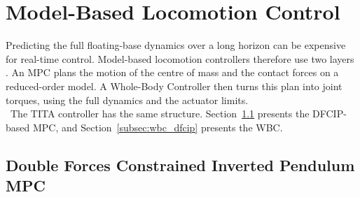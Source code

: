 \section{Model-Based Locomotion Control}
\label{sec:model_based_control}

Predicting the full floating-base dynamics over a long horizon can be expensive
for real-time control. Model-based locomotion controllers therefore use two
layers \cite{legged_optimization, cheetah_mpc}. An MPC plans the motion of the
centre of mass and the contact forces on a reduced-order model. A Whole-Body
Controller then turns this plan into joint torques, using the full dynamics and
the actuator limits.\\
\
The TITA controller has the same structure.
Section~\ref{subsec:dfcip_mpc} presents the DFCIP-based MPC, and
Section~\ref{subsec:wbc_dfcip} presents the WBC.

\subsection{Double Forces Constrained Inverted Pendulum MPC}
\label{subsec:dfcip_mpc}

